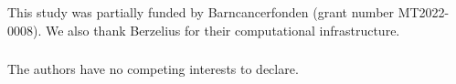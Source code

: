 \documentclass[runningheads]{llncs}
\begin{document}
\begin{credits}
\subsubsection{\ackname} This study was partially funded by Barncancerfonden (grant number MT2022-0008). We also thank Berzelius for their computational infrastructure. %

\subsubsection{\discintname}
The authors have no competing interests to declare.
\end{credits}
%
%
%


%




\end{document}
